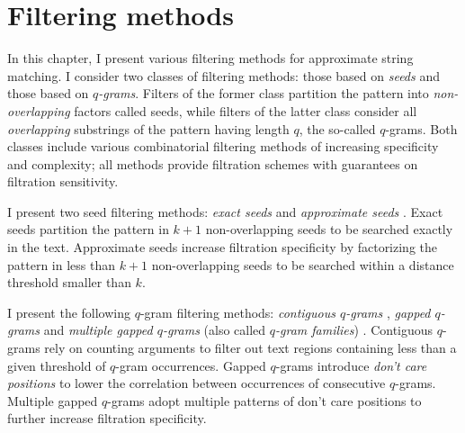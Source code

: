 \chapter{Filtering methods}
\label{sec:filter}

In this chapter, I present various filtering methods for approximate string matching.
I consider two classes of filtering methods: those based on \emph{seeds} and those based on \emph{$q$-grams}.
Filters of the former class partition the pattern into \emph{non-overlapping} factors called seeds, while filters of the latter class consider all \emph{overlapping} substrings of the pattern having length $q$, the so-called $q$-grams.
Both classes include various combinatorial filtering methods of increasing specificity and complexity; all methods provide filtration schemes with guarantees on filtration sensitivity.

I present two seed filtering methods:
\emph{exact seeds} \citep{Baeza1992} and
\emph{approximate seeds} \citep{Myers1994,Navarro2000}.
Exact seeds partition the pattern in $k+1$ non-overlapping seeds to be searched exactly in the text.
Approximate seeds increase filtration specificity by factorizing the pattern in less than $k+1$ non-overlapping seeds to be searched within a distance threshold smaller than $k$.

I present the following $q$-gram filtering methods:
\emph{contiguous $q$-grams} \citep{Jokinen1991},
\emph{gapped $q$-grams} \citep{Burkhardt2001} and
\emph{multiple gapped $q$-grams} (also called \emph{$q$-gram families}) \citep{Kucherov2005}.
Contiguous $q$-grams rely on counting arguments to filter out text regions containing less than a given threshold of $q$-gram occurrences.
Gapped $q$-grams introduce \emph{don't care positions} to lower the correlation between occurrences of consecutive $q$-grams.
Multiple gapped $q$-grams adopt multiple patterns of don't care positions to further increase filtration specificity.

